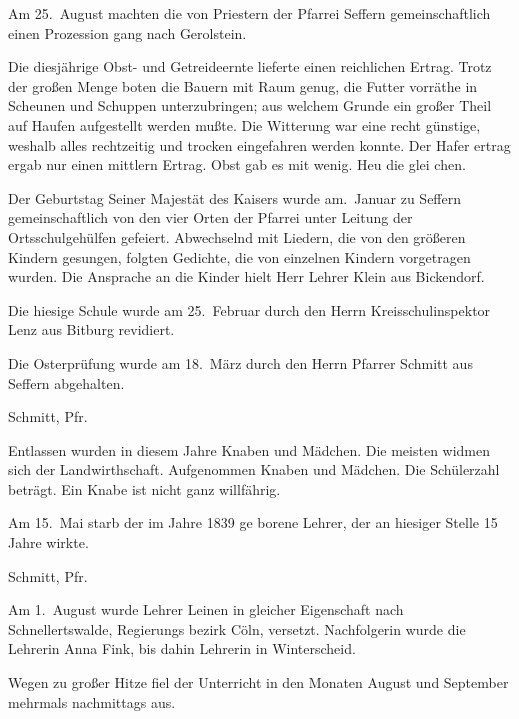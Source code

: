 

\pstart
Am 25.\ August machten die von Priestern der\ob
Pfarrei Seffern gemeinschaftlich einen Prozession\ohb
gang nach Gerolstein.

\pend
{}
\pstart

Die diesjährige Obst- und Getreideernte lieferte\ob
einen reichlichen Ertrag. Trotz der großen Menge\ob
boten die Bauern mit Raum genug, die Futter\ohb
vorräthe in Scheunen und Schuppen unterzubringen;\ob
aus welchem Grunde ein großer Theil auf Haufen\ob
aufgestellt werden mußte. Die Witterung war eine\ob
recht günstige, weshalb alles rechtzeitig und\ob
trocken eingefahren werden konnte. Der Hafer\ohb
ertrag ergab nur einen mittlern Ertrag. Obst\ob
gab es mit wenig. Heu die glei\ohb
chen\unsicher.

\pend
{}
\pstart

Der Geburtstag Seiner Majestät des Kaisers wurde am.\ Januar zu Seffern gemeinschaftlich von den vier Orten\ob
der Pfarrei unter Leitung der Ortsschulgehülfen\unsicher{} gefeiert.\ob
Abwechselnd mit Liedern, die von den größeren Kindern\ob
gesungen, folgten Gedichte, die von einzelnen Kindern\ob
vorgetragen wurden. Die Ansprache an die Kinder\ob
hielt Herr Lehrer Klein aus Bickendorf.

\pend
{}
\pstart

Die hiesige Schule wurde am 25.\ Februar durch den\ob
Herrn Kreisschulinspektor Lenz aus Bitburg revidiert.

\pend
{}
\pstart

Die Osterprüfung wurde am 18.\ März durch den\ob
Herrn Pfarrer Schmitt aus Seffern abgehalten.

\pend
{}
\pstart

Schmitt, Pfr.

\pend
{}
\pstart

Entlassen wurden in diesem Jahre\unsicher{} Knaben und\unsicher{} Mädchen. Die meisten widmen sich der\ob
Landwirthschaft. Aufgenommen\unsicher{} Knaben\ob
und\unsicher{} Mädchen. Die Schülerzahl beträgt\unsicher.\ob
Ein Knabe ist nicht ganz willfährig.

Am 15.\ Mai starb der im Jahre 1839\unsicher{} ge\ohb
borene\unsicher{} Lehrer\unsicher, der an hiesiger\ob
Stelle 15\unsicher{} Jahre wirkte.

\pend
{}
\pstart

Schmitt, Pfr.

\pend
{}
\pstart

Am 1.\ August wurde Lehrer Leinen\unsicher{} in gleicher\ob
Eigenschaft nach Schnellertswalde\unsicher, Regierungs\ohb
bezirk Cöln, versetzt. Nachfolgerin wurde die\ob
Lehrerin Anna Fink\unsicher, bis dahin Lehrerin in\ob
Winterscheid\unsicher.

\pend
{}
\pstart

Wegen zu großer Hitze fiel der Unterricht in\ob
den Monaten August und September mehrmals\ob
nachmittags aus.
\pend
